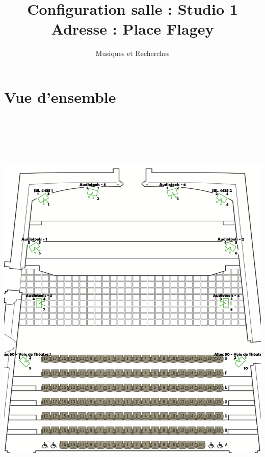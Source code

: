 \documentclass[12pt,a4paper]{report}
\author{Musiques et Recherches}
\title{Configuration salle : Studio 1 \\ Adresse :  Place Flagey}
\begin{document}
\maketitle
\chapter*{Vue d'ensemble}
 \begin{center}
\includegraphics[height=20cm]{data/planSalle123.pdf}
\end{center}
\end{document}
